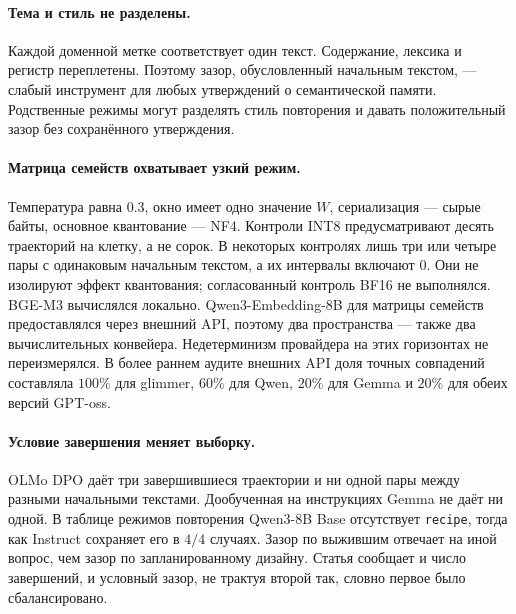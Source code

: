 \documentclass[10pt]{article}
\begin{document}
\paragraph{Тема и стиль не разделены.}
Каждой доменной метке соответствует один текст.
Содержание, лексика и регистр переплетены. %
Поэтому зазор, обусловленный начальным текстом, --- слабый инструмент
для любых утверждений о семантической памяти.
Родственные режимы могут разделять стиль повторения
и давать положительный зазор без сохранённого утверждения.

\paragraph{Матрица семейств охватывает узкий режим.}
Температура равна $0.3$, окно имеет одно значение $W$,
сериализация --- сырые байты, основное квантование --- NF4. %
Контроли INT8 предусматривают десять траекторий на клетку, а не сорок. %
В некоторых контролях лишь три или четыре пары с одинаковым начальным текстом,
а их интервалы включают $0$. %
Они не изолируют эффект квантования;
согласованный контроль BF16 не выполнялся.
BGE-M3 вычислялся локально.
Qwen3-Embedding-8B для матрицы семейств предоставлялся через внешний API,
поэтому два пространства --- также два вычислительных конвейера. %
Недетерминизм провайдера на этих горизонтах не переизмерялся.
В более раннем аудите внешних API доля точных совпадений составляла
$100\%$ для glimmer, $60\%$ для Qwen, $20\%$ для Gemma
и $20\%$ для обеих версий GPT-oss. %

\paragraph{Условие завершения меняет выборку.}
OLMo DPO даёт три завершившиеся траектории и ни одной пары между
разными начальными текстами.
Дообученная на инструкциях Gemma не даёт ни одной.
В таблице режимов повторения Qwen3-8B Base отсутствует
\texttt{recipe}, тогда как Instruct сохраняет его в $4/4$ случаях. %
Зазор по выжившим отвечает на иной вопрос,
чем зазор по запланированному дизайну.
Статья сообщает и число завершений, и условный зазор,
не трактуя второй так, словно первое было сбалансировано.
\end{document}
